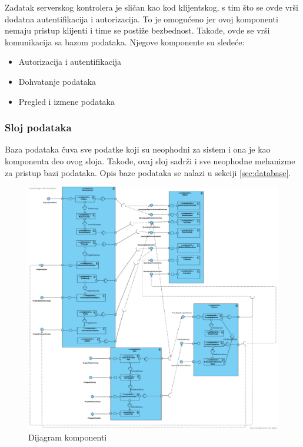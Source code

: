 Zadatak serverskog kontrolera je sličan kao kod klijentskog, s tim što se ovde vrši dodatna autentifikacija 
i autorizacija. To je omogućeno jer ovoj komponenti nemaju pristup klijenti i time se postiže bezbednost.
Takođe, ovde se vrši komunikacija sa bazom podataka.
Njegove komponente su sledeće:

\begin{itemize}
    \item Autorizacija i autentifikacija
    \item Dohvatanje podataka
    \item Pregled i izmene podataka 
\end{itemize}

\subsubsection {Sloj podataka}

Baza podataka čuva sve podatke koji su neophodni za sistem i ona je kao komponenta deo ovog sloja.
Takođe, ovaj sloj sadrži i sve neophodne mehanizme za pristup bazi podataka.
Opis baze podataka se nalazi u sekciji \ref{sec:database}.


\begin{figure}[H]
  \begin{center}
      \includegraphics[width=\textwidth]{Diagrams/dijagram_komponenti.png}
  \end{center}
  \caption {Dijagram komponenti}
  \label{dijagram_komponenti}

\end{figure}


